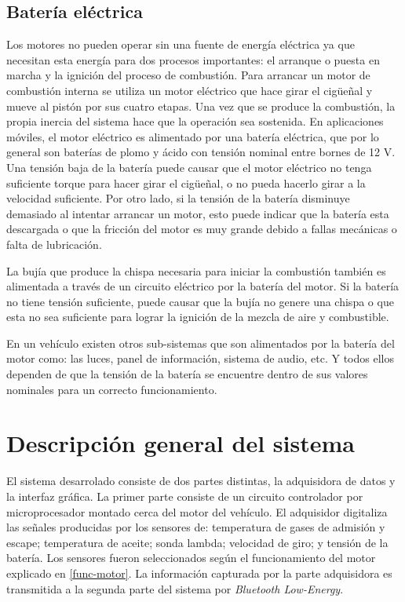 \subsection{Batería eléctrica}
Los motores no pueden operar sin una fuente de energía eléctrica ya que necesitan esta energía para dos procesos importantes: el arranque o puesta en marcha y la ignición del proceso de combustión.
Para arrancar un motor de combustión interna se utiliza un motor eléctrico que hace girar el cigüeñal y mueve al pistón por sus cuatro etapas. Una vez que se produce la combustión, la propia inercia del sistema hace que la operación sea sostenida. En aplicaciones móviles, el motor eléctrico es alimentado por una batería eléctrica, que por lo general son baterías de plomo y ácido con tensión nominal entre bornes de 12 V. Una tensión baja de la batería puede causar que el motor eléctrico no tenga suficiente torque para hacer girar el cigüeñal, o no pueda hacerlo girar a la velocidad suficiente. Por otro lado, si la tensión de la batería disminuye demasiado al intentar arrancar un motor, esto puede indicar que la batería esta descargada o que la fricción del motor es muy grande debido a fallas mecánicas o falta de lubricación.

La bujía que produce la chispa necesaria para iniciar la combustión también es alimentada a través de un circuito eléctrico por la batería del motor. Si la batería no tiene tensión suficiente, puede causar que la bujía no genere una chispa o que esta no sea suficiente para lograr la ignición de la mezcla de aire y combustible.

En un vehículo existen otros sub-sistemas que son alimentados por la batería del motor como: las luces, panel de información, sistema de audio, etc. Y todos ellos dependen de que la tensión de la batería se encuentre dentro de sus valores nominales para un correcto funcionamiento.

\section{Descripción general del sistema}

El sistema desarrolado consiste de dos partes distintas, la adquisidora de datos y la interfaz gráfica. La primer parte consiste de un circuito controlador por microprocesador montado cerca del motor del vehículo. El adquisidor digitaliza las señales producidas por los sensores de: temperatura de gases de admisión y escape; temperatura de aceite; sonda lambda; velocidad de giro; y tensión de la batería. Los sensores fueron seleccionados según el funcionamiento del motor explicado en \ref{func-motor}.  La información capturada por la parte adquisidora es transmitida a la segunda parte del sistema por \textit{Bluetooth Low-Energy}.

